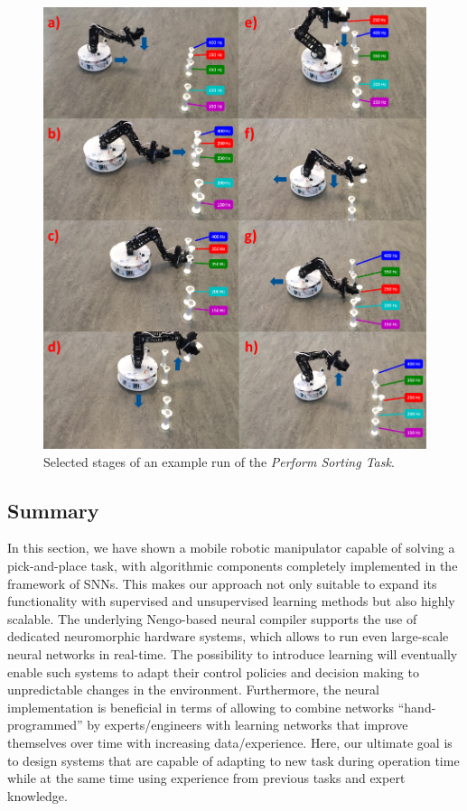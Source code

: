 \begin{figure}[t!]
    \centering
    \includegraphics[width=0.85\linewidth]{imgs/omni_bot_example_run.png}
    \caption{Selected stages of an example run of the \emph{Perform Sorting Task}.}
    \label{fig:omni_bot_example_run}
\end{figure}
\subsection{Summary}%
\label{subsec:summary_mobile_manipulation}

In this section, we have shown a mobile robotic manipulator capable of solving a pick-and-place task, with algorithmic components completely implemented in the framework of \aclp{SNN}. 
This makes our approach not only suitable to expand its functionality with supervised and unsupervised learning methods but also highly scalable. 
The underlying \ac{Nengo}-based neural compiler supports the use of dedicated neuromorphic hardware systems, which allows to run even large-scale neural networks in real-time. 
The possibility to introduce learning will eventually enable such systems to adapt their control policies and decision making to unpredictable changes in the environment. 
Furthermore, the neural implementation is beneficial in terms of allowing to combine networks “hand-programmed” by experts/engineers with learning networks that improve themselves over time with increasing data/experience. 
Here, our ultimate goal is to design systems that are capable of adapting to new task during operation time while at the same time using experience from previous tasks and expert knowledge.

